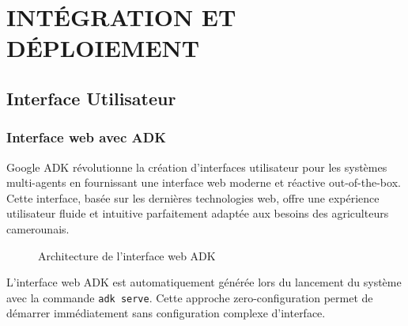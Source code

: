 \chapter{INTÉGRATION ET DÉPLOIEMENT}

\section{Interface Utilisateur}

\subsection{Interface web avec ADK}

Google ADK révolutionne la création d'interfaces utilisateur pour les systèmes multi-agents en fournissant une interface web moderne et réactive out-of-the-box. Cette interface, basée sur les dernières technologies web, offre une expérience utilisateur fluide et intuitive parfaitement adaptée aux besoins des agriculteurs camerounais.

\begin{figure}[H]
\centering
{}
\caption{Architecture de l'interface web ADK}
\end{figure}

L'interface web ADK est automatiquement générée lors du lancement du système avec la commande \texttt{adk serve}. Cette approche zero-configuration permet de démarrer immédiatement sans configuration complexe d'interface.

